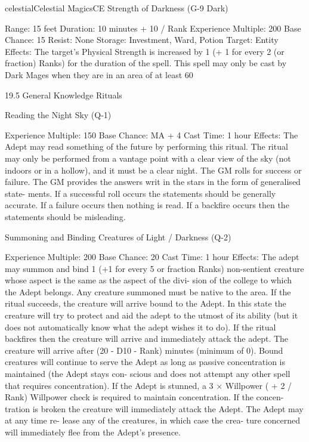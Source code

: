 \begin{College}[1.3]{celestial}{Celestial Magics}{CE}
Strength of Darkness (G-9 Dark) 

Range: 15 feet 
Duration: 10 minutes + 10 / Rank 
Experience Multiple: 200 
Base Chance: 15%
Resist: None 
Storage: Investment, Ward, Potion 
Target: Entity 
Effects: The target’s Physical Strength is increased 
by  1  (+  1  for  every  2  (or  fraction)  Ranks)  for  the 
duration  of  the  spell.  This  spell  may  only  be  cast 
by Dark Mages when they are in an area of at least 
60%

19.5 General Knowledge Rituals  

Reading the Night Sky (Q-1) 

Experience Multiple: 150 
Base Chance: MA + 4%
Cast Time: 1 hour 
Effects:  The  Adept  may  read  something  of  the 
future  by  performing  this  ritual.  The  ritual  may 
only  be  performed  from  a  vantage  point  with  a 
clear view  of the sky (not indoors or in a hollow), 
and  it  must  be  a  clear  night.  The  GM  rolls  for 
success  or  failure.  The  GM  provides  the  answers 
writ  in  the  stars  in  the  form  of  generalised  state-
ments.  If  a  successful  roll  occurs  the  statements 
should  be  generally  accurate.  If  a  failure  occurs 
then  nothing  is  read.  If  a  backfire  occurs  then  the 
statements should be misleading. 

Summoning and Binding Creatures of 
Light / Darkness (Q-2) 

Experience Multiple: 200 
Base Chance: 20%
Cast Time: 1 hour 
Effects: The adept may summon and bind 1 (+1 for 
every  5  or  fraction  Ranks)  non-sentient  creature 
whose aspect is the same as the aspect of the divi-
sion  of  the  college  to  which  the  Adept  belongs. 
Any creature summoned must be native to the area. 
If the ritual succeeds, the creature will arrive bound 
to  the  Adept.  In  this  state  the  creature  will  try  to 
protect and aid the adept to the utmost of its ability 
(but it does not automatically know what the adept 
wishes  it  to  do).  If  the  ritual  backfires  then  the 
creature  will  arrive  and  immediately  attack  the 
adept.  The  creature  will  arrive  after  (20  -  D10  - 
Rank)  minutes  (minimum  of  0).  Bound  creatures 
will continue to serve the Adept as long as passive 
concentration  is  maintained  (the  Adept  stays  con-
scious  and  does  not  attempt  any  other  spell  that 
requires concentration). If the Adept is stunned, a 3 
×  Willpower  (  +  2  /  Rank)  Willpower  check  is 
required  to  maintain  concentration.  If  the  concen-
tration  is  broken  the  creature  will  immediately 
attack  the  Adept.  The  Adept  may  at  any  time  re-
lease  any  of  the  creatures,  in  which case  the  crea-
ture  concerned  will  immediately  flee  from  the 
Adept’s presence.  


\end{College}
